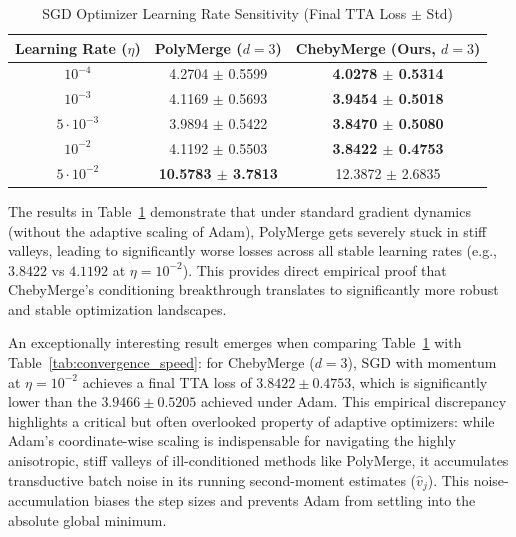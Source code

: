\documentclass{article}
\theoremstyle{plain}
\theoremstyle{definition}
\theoremstyle{remark}
\begin{document}
\begin{table}[h]
\caption{SGD Optimizer Learning Rate Sensitivity (Final TTA Loss $\pm$ Std)}
\label{tab:sgd_sensitivity}
\vskip 0.15in
\begin{center}
\begin{small}
\begin{tabular}{ccc}
\toprule
Learning Rate ($\eta$) & PolyMerge ($d=3$) & ChebyMerge (Ours, $d=3$) \\
\midrule
$10^{-4}$ & 4.2704 $\pm$ 0.5599 & \textbf{4.0278 $\pm$ 0.5314} \\
$10^{-3}$ & 4.1169 $\pm$ 0.5693 & \textbf{3.9454 $\pm$ 0.5018} \\
$5 \cdot 10^{-3}$ & 3.9894 $\pm$ 0.5422 & \textbf{3.8470 $\pm$ 0.5080} \\
$10^{-2}$ & 4.1192 $\pm$ 0.5503 & \textbf{3.8422 $\pm$ 0.4753} \\
$5 \cdot 10^{-2}$ & \textbf{10.5783 $\pm$ 3.7813} & 12.3872 $\pm$ 2.6835 \\
\bottomrule
\end{tabular}
\end{small}
\end{center}
\vskip -0.1in
\end{table}

The results in Table~\ref{tab:sgd_sensitivity} demonstrate that under standard gradient dynamics (without the adaptive scaling of Adam), PolyMerge gets severely stuck in stiff valleys, leading to significantly worse losses across all stable learning rates (e.g., $3.8422$ vs $4.1192$ at $\eta=10^{-2}$). This provides direct empirical proof that ChebyMerge's conditioning breakthrough translates to significantly more robust and stable optimization landscapes.

An exceptionally interesting result emerges when comparing Table~\ref{tab:sgd_sensitivity} with Table~\ref{tab:convergence_speed}: for ChebyMerge ($d=3$), SGD with momentum at $\eta = 10^{-2}$ achieves a final TTA loss of $3.8422 \pm 0.4753$, which is significantly lower than the $3.9466 \pm 0.5205$ achieved under Adam. This empirical discrepancy highlights a critical but often overlooked property of adaptive optimizers: while Adam's coordinate-wise scaling is indispensable for navigating the highly anisotropic, stiff valleys of ill-conditioned methods like PolyMerge, it accumulates transductive batch noise in its running second-moment estimates ($\hat{v}_j$). This noise-accumulation biases the step sizes and prevents Adam from settling into the absolute global minimum. 
\end{document}
